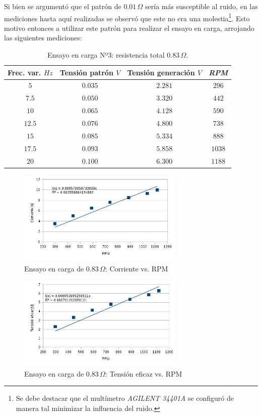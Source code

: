 \documentclass[a4paper,11pt,twoside]{IT-CNEA}
\begin{document}
\par Si bien se argumentó que el patrón de $0.01\,\varOmega$ sería más susceptible al ruido, en las mediciones hasta aquí realizadas se observó que este no era una molestia\footnote{Se debe destacar que el multímetro \textit{AGILENT 34401A} se configuró de manera tal minimizar la influencia del ruido.}. Esto motivo entonces a utilizar este patrón para realizar el ensayo en carga, arrojando las siguientes mediciones:
\begin{table}[h!]
\centering
\caption{Ensayo en carga Nº3: resistencia total $0.83\,\varOmega$.}
\label{tabla:carga083}
\begin{tabular}{|c|c|c|c|}
\hline
Frec. var. $Hz$ & Tensión patrón $V$ & Tensión generación $V$  & \textit{RPM}\\ \hline

$5$&$0.035$&$2.281$&$296$ \\ \hline
$7.5$&$0.050$&$3.320$&$442$ \\ \hline
$10$&$0.065$&$4.128$&$590$ \\ \hline
$12.5$&$0.076$&$4.800$&$738$ \\ \hline
$15$&$0.085$&$5.334$&$888$ \\ \hline
$17.5$&$0.093$&$5.858$&$1038$ \\ \hline
$20$&$0.100$&$6.300$&$1188$ \\ \hline

\end{tabular}
\end{table}
\begin{figure}[h!]
\centering
\includegraphics[width=8cm]{Figuras/CargaCorriente083.jpg}
\caption{Ensayo en carga de $0.83\,\varOmega$: Corriente vs. RPM}
\label{fig:CargaCorriente083}
\end{figure}
\begin{figure}[h!]
\centering
\includegraphics[width=8cm]{Figuras/CargaTension083.jpg}
\caption{Ensayo en carga de $0.83\,\varOmega$: Tensión eficaz vs. RPM}
\label{fig:CargaTension083}
\end{figure}
\end{document}
